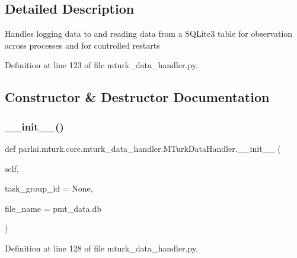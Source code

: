 \subsection{Detailed Description}
\begin{DoxyVerb}Handles logging data to and reading data from a SQLite3 table for
observation across processes and for controlled restarts
\end{DoxyVerb}
 

Definition at line 123 of file mturk\+\_\+data\+\_\+handler.\+py.



\subsection{Constructor \& Destructor Documentation}
\mbox{\label{classparlai_1_1mturk_1_1core_1_1mturk__data__handler_1_1MTurkDataHandler_a7edbb0b1f770656a6ed49990cd3933c1}} 
\subsubsection{\texorpdfstring{\+\_\+\+\_\+init\+\_\+\+\_\+()}{\_\_init\_\_()}}
{\footnotesize\ttfamily def parlai.\+mturk.\+core.\+mturk\+\_\+data\+\_\+handler.\+M\+Turk\+Data\+Handler.\+\_\+\+\_\+init\+\_\+\+\_\+ (\begin{DoxyParamCaption}\item[{}]{self,  }\item[{}]{task\+\_\+group\+\_\+id = {\ttfamily None},  }\item[{}]{file\+\_\+name = {\ttfamily \textquotesingle{}pmt\+\_\+data.db\textquotesingle{}} }\end{DoxyParamCaption})}



Definition at line 128 of file mturk\+\_\+data\+\_\+handler.\+py.



